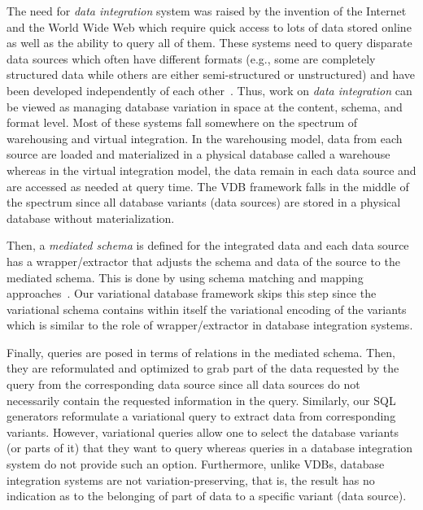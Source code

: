 The need for \emph{data integration} system was raised by the invention of the Internet and 
the World Wide Web which require quick access to lots of data stored online as well
as the ability to query all of them. These systems need to query disparate data sources
which often have different formats (e.g., some are completely structured data while others are 
either semi-structured or unstructured) and have been developed independently of each 
other~\cite{dataIntegBook}.
%
Thus, work on \emph{data integration} can be viewed as managing database variation in
space at the content, schema, and format level.
%
Most of these systems fall somewhere on the spectrum of warehousing and 
virtual integration. In the warehousing model, data from each source are loaded
and materialized in a physical database called a warehouse whereas
in the virtual integration model, the data remain in each data source and are 
accessed as needed at query time. The VDB framework falls in the middle of 
the spectrum since all database variants (data sources) are stored in a physical database 
without materialization. 

Then, a \emph{mediated schema} is defined for the integrated data and each 
data source has a wrapper/extractor that adjusts the schema and data of the
source to the mediated schema. This is done by using schema matching and 
mapping approaches~\cite{Rahm01Survey,Doan05, schMapBook}. 
Our variational database framework skips this
step since the variational schema contains within itself the variational encoding
of the variants which is similar to the role of  wrapper/extractor in database integration
systems. 

Finally, queries are posed in terms of relations in the mediated schema. Then, they 
are reformulated and optimized to grab part of the data requested by the query from 
the corresponding data source since all data sources do not necessarily contain 
the requested information in the query. Similarly, our SQL generators reformulate a 
variational query to extract data from corresponding variants. However, variational 
queries allow one to select the database variants (or parts of it) that they want to query
whereas queries in a database integration system do not provide such an option. 
Furthermore, unlike VDBs, database integration systems are not variation-preserving, that is, the 
result has no indication as to the belonging of part of data to a specific variant (data source).



